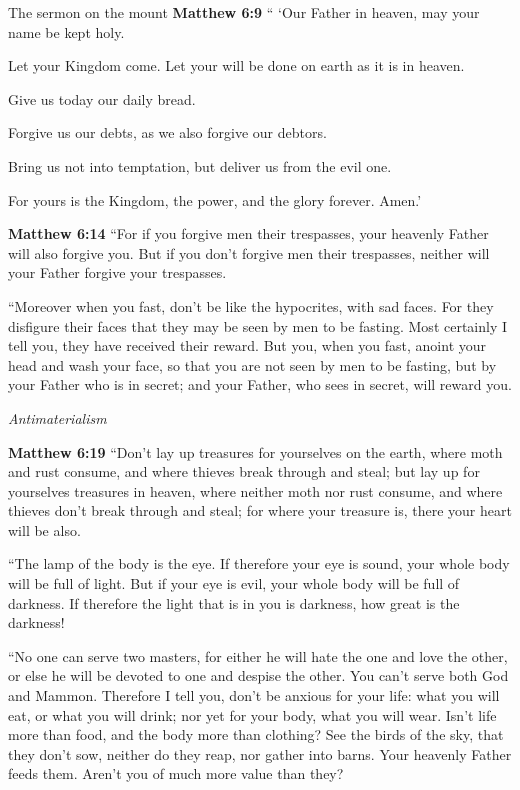 \documentclass[10pt,twoside]{article} %
\newcommand{\quotesize}{\normalsize{}}
\newenvironment{quotetext}{\begingroup\quotesize}{\endgroup}
\newcommand{\bible}[2]{\begin{quotetext}\textbf{#1} #2\end{quotetext}}
\newcommand{\matthew}[2]{\bible{Matthew #1}{#2}}
\newcommand{\subhead}[1]{\emph{#1}\par}
\begin{document}
\begin{section}{The sermon on the mount}
\matthew{6:9}{
`` `Our Father in heaven, may your name be kept holy.

   Let your Kingdom come.
Let your will be done on earth as it is in heaven.

   Give us today our daily bread.

   Forgive us our debts,
as we also forgive our debtors.

   Bring us not into temptation,
but deliver us from the evil one.

For yours is the Kingdom, the power, and the glory forever. Amen.'
}

\matthew{6:14}{
   ``For if you forgive men their trespasses, your heavenly Father will also forgive you.    But if you don't forgive men their trespasses, neither will your Father forgive your trespasses.

   ``Moreover when you fast, don't be like the hypocrites, with sad faces. For they disfigure their faces that they may be seen by men to be fasting. Most certainly I tell you, they have received their reward.    But you, when you fast, anoint your head and wash your face,    so that you are not seen by men to be fasting, but by your Father who is in secret; and your Father, who sees in secret, will reward you.}

\subhead{Antimaterialism}

\matthew{6:19}{
   ``Don't lay up treasures for yourselves on the earth, where moth and rust consume, and where thieves break through and steal;    but lay up for yourselves treasures in heaven, where neither moth nor rust consume, and where thieves don't break through and steal;    for where your treasure is, there your heart will be also.

   ``The lamp of the body is the eye. If therefore your eye is sound, your whole body will be full of light.    But if your eye is evil, your whole body will be full of darkness. If therefore the light that is in you is darkness, how great is the darkness!

   ``No one can serve two masters, for either he will hate the one and love the other, or else he will be devoted to one and despise the other. You can't serve both God and Mammon.    Therefore I tell you, don't be anxious for your life: what you will eat, or what you will drink; nor yet for your body, what you will wear. Isn't life more than food, and the body more than clothing?    See the birds of the sky, that they don't sow, neither do they reap, nor gather into barns. Your heavenly Father feeds them. Aren't you of much more value than they?

}
\end{section}
\end{document}
